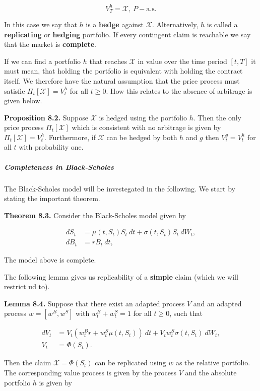 \documentclass[
]{article}
\begin{document}
\[
V_T^h=\mathcal{X},\ P-\text{a.s.}\tag{8.1}
\]

In this case we say that \(h\) is a \textbf{hedge} against
\(\mathcal{X}\). Alternatively, \(h\) is called a \textbf{replicating}
or \textbf{hedging} portfolio. If every contingent claim is reachable we
say that the market is \textbf{complete}.

If we can find a portfolio \(h\) that reaches \(\mathcal{X}\) in value
over the time period \([t,T]\) it must mean, that holding the portfolio
is equivalent with holding the contract itself. We therefore have the
natural assumption that the price process must satisfie
\(\Pi_t[\mathcal{X}]=V_t^h\) for all \(t\ge 0\). How this relates to the
absence of arbitrage is given below.

\textbf{Proposition 8.2.} Suppose \(\mathcal{X}\) is hedged using the
portfolio \(h\). Then the only price process \(\Pi_t[\mathcal{X}]\)
which is consistent with no arbitrage is given by
\(\Pi_t[\mathcal{X}]=V_t^h\). Furthermore, if \(\mathcal{X}\) can be
hedged by both \(h\) and \(g\) then \(V_t^g=V_t^h\) for all \(t\) with
probability one.

\hypertarget{completeness-in-black-scholes}{%
\subparagraph{Completeness in
Black-Scholes}\label{completeness-in-black-scholes}}

The Black-Scholes model will be investegated in the following. We start
by stating the important theorem.

\textbf{Theorem 8.3.} Consider the Black-Scholes model given by

\begin{align*}
dS_t&=\mu(t,S_t) S_t\ dt+\sigma(t,S_t) S_t\ dW_t,\tag{8.2}\\
dB_t&=r B_t\ dt,\tag{8.3}
\end{align*}

The model above is complete.

The following lemma gives us replicability of a \textbf{simple} claim
(which we will restrict ud to).

\textbf{Lemma 8.4.} Suppose that there exist an adapted process \(V\)
and an adapted process \(w=[w^B,w^S]\) with \(w^B_t+w^S_t=1\) for all
\(t\ge 0\), such that

\begin{align*}
dV_t&=V_t(w_t^Br+w_t^S\mu(t,S_t))\ dt+V_tw_t^S\sigma(t,S_t)\ dW_t,\\
V_t&=\Phi(S_t).
\end{align*}

Then the claim \(\mathcal{X}=\Phi(S_t)\) can be replicated using \(w\)
as the relative portfolio. The corresponding value process is given by
the process \(V\) and the absolute portfolio \(h\) is given by
\end{document}
